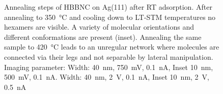 \begin{figure}[h!]\centering
	 \quad
\caption{Annealing steps of HBBNC on Ag(111) after RT adsorption.  After annealing to \SI{350}{\celsius} and cooling down to LT-STM temperatures no hexamers are visible. A variety of molecular orientations and different conformations are present (inset).  Annealing the same sample to \SI{420}{\celsius} leads to an unregular network where molecules are connected via their legs and not separable by lateral manipulation. Imaging parameter:  Width: \SI{40}{\nano \meter}, \SI{750}{\milli \volt}, \SI{0.1}{\nano \ampere}, Inset \SI{10}{\nano \meter}, \SI{500}{\milli \volt}, \SI{0.1}{\nano \ampere}.  Width: \SI{40}{\nano \meter}, \SI{2}{\volt}, \SI{0.1}{\nano \ampere}, Inset \SI{10}{\nano \meter}, \SI{2}{\volt}, \SI{0.5}{\nano \ampere}}
\label{fig:HBBNC-annealing}
\end{figure}

